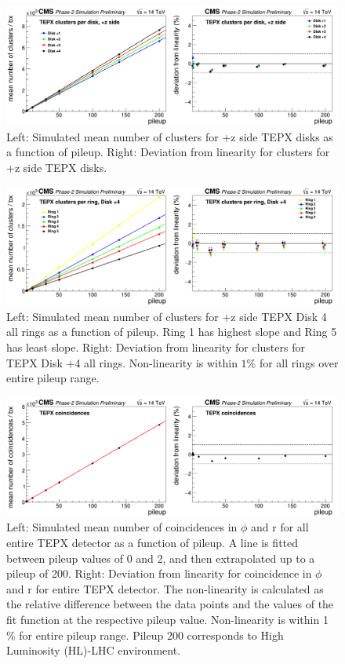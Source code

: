 \begin{figure}[H]
  \centering
  \includegraphics[width=1 \columnwidth]{ashish_thesis/clustersperdisk+z.png}
  \caption{Left: Simulated mean number of clusters for +z side TEPX disks as a function of pileup. Right: Deviation from linearity for clusters for +z side TEPX disks.}
  \label{fig:CMS}
\end{figure}




\begin{figure}[H]
  \centering
  \includegraphics[width=1\columnwidth]{ashish_thesis/clustersperringD+4.png}
  \caption{Left: Simulated mean number of clusters for +z side TEPX Disk 4 all rings as a function of pileup. Ring 1 has highest slope and Ring 5 has least slope. Right: Deviation from linearity for clusters for TEPX Disk +4 all rings. Non-linearity is within $1\%$ for all rings over entire pileup range.}
  \label{fig:CMS}
\end{figure}


\begin{figure}[H]
  \centering
  \includegraphics[width=1 \columnwidth]{ashish_thesis/totalcoincidences.png}
  \caption{Left: Simulated mean number of coincidences in $\phi$ and r for all entire TEPX detector as a function of pileup. A line is fitted between pileup values of 0 and 2, and then extrapolated up to a pileup of 200. Right: Deviation from linearity for coincidence in $\phi$ and r for entire TEPX detector. The non-linearity is calculated as the relative difference between the data points and the values of the fit function at the respective pileup value. Non-linearity is within 1 \% for entire pileup range. Pileup 200 corresponds to High Luminosity (HL)-LHC environment.}
  \label{fig:CMS}
\end{figure}


